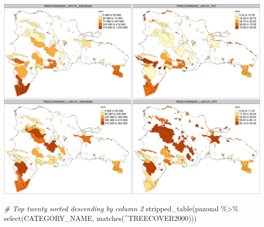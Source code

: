 \documentclass[10pt,landscape,a3paper]{article}
\newenvironment{Shaded}{\begin{snugshade}}{\end{snugshade}}
\newcommand{\CommentTok}[1]{\textcolor[rgb]{0.56,0.35,0.01}{\textit{#1}}}
\newcommand{\FunctionTok}[1]{\textcolor[rgb]{0.00,0.00,0.00}{#1}}
\newcommand{\NormalTok}[1]{#1}
\newcommand{\SpecialCharTok}[1]{\textcolor[rgb]{0.00,0.00,0.00}{#1}}
\newcommand{\StringTok}[1]{\textcolor[rgb]{0.31,0.60,0.02}{#1}}
\begin{document}
\begin{center}\includegraphics{img/zonal-pa-1} \end{center}

\begin{Shaded}
\begin{Highlighting}[]
\CommentTok{\# Top twenty sorted descending by column 2}
\FunctionTok{stripped\_table}\NormalTok{(pazonal }\SpecialCharTok{\%\textgreater{}\%} \FunctionTok{select}\NormalTok{(CATEGORY\_NAME, }\FunctionTok{matches}\NormalTok{(}\StringTok{\textquotesingle{}\^{}TREECOVER2000\textquotesingle{}}\NormalTok{)))}
\end{Highlighting}
\end{Shaded}
\end{document}
